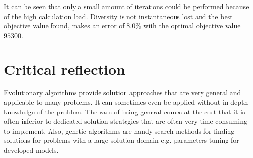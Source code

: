 \documentclass[a4paper,10pt]{article}
\begin{document}
It can be seen that only a small amount of iterations could be performed because of the high calculation load. Diversity is not instantaneous lost and the best objective value found, makes an error of $ 8.0 \% $ with the optimal objective value $ 95300 $.



\section{Critical reflection}

Evolutionary algorithms provide solution approaches that are very general and applicable to many problems. It can sometimes even be applied without in-depth knowledge of the problem. The ease of being general comes at the cost that it is often inferior to dedicated solution strategies that are often very time consuming to implement. Also, genetic algorithms are handy search methods for finding solutions for problems with a large solution domain e.g. parameters tuning for developed models.  


\clearpage


\end{document}
